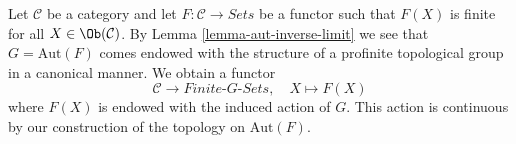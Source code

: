\begin{example}
\label{example-from-C-F-to-G-sets}
Let $\mathcal{C}$ be a category and let $F : \mathcal{C} \to \textit{Sets}$
be a functor such that $F(X)$ is finite for all $X \in \Ob(\mathcal{C})$.
By Lemma \ref{lemma-aut-inverse-limit} we see that $G = \text{Aut}(F)$
comes endowed with the structure of a profinite topological group in a
canonical manner. We obtain a functor
\begin{equation}
\label{equation-remember}
\mathcal{C} \longrightarrow \textit{Finite-}G\textit{-Sets},\quad
X \longmapsto F(X)
\end{equation}
where $F(X)$ is endowed with the induced action of $G$. This action
is continuous by our construction of the topology on $\text{Aut}(F)$.
\end{example}